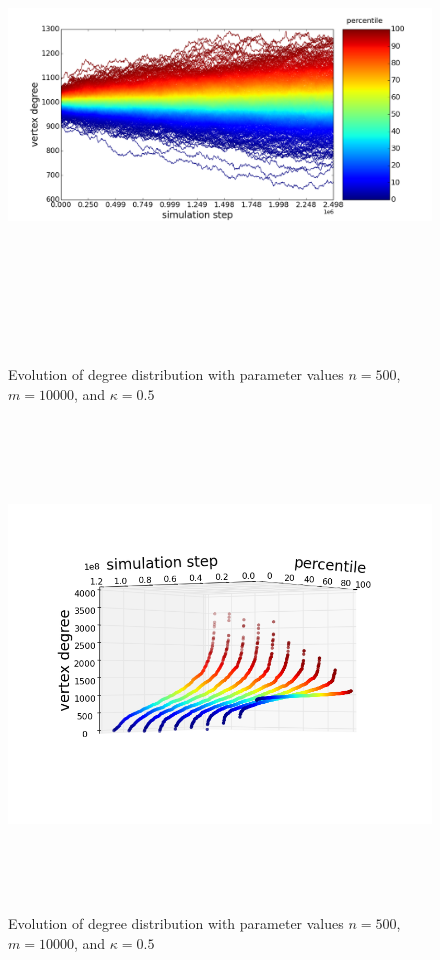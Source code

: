 \documentclass[11pt]{article}
\begin{document}
\begin{figure}[h!]
  \centering
  \includegraphics[height=130mm]{n_500_short}
  \caption{Evolution of degree distribution with parameter values $n=500$, $m=10000$, and $\kappa=0.5$}
  \label{fig:500sv}
\end{figure}
\begin{figure}[h!]
  \centering
  \includegraphics[height=130mm]{n_500_long_3d}
  \caption{Evolution of degree distribution with parameter values $n=500$, $m=10000$, and $\kappa=0.5$}
  \label{fig:500s3}
\end{figure}
\end{document}
